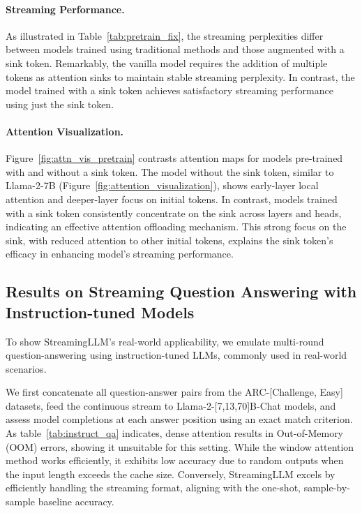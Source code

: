\paragraph{Streaming Performance.} As illustrated in Table~\ref{tab:pretrain_fix}, the streaming perplexities differ between models trained using traditional methods and those augmented with a sink token. Remarkably, the vanilla model requires the addition of multiple tokens as attention sinks to maintain stable streaming perplexity. In contrast, the model trained with a sink token achieves satisfactory streaming performance using just the sink token.

\paragraph{Attention Visualization.} 
Figure~\ref{fig:attn_vis_pretrain} contrasts attention maps for models pre-trained with and without a sink token. The model without the sink token, similar to Llama-2-7B (Figure~\ref{fig:attention_visualization}), shows early-layer local attention and deeper-layer focus on initial tokens. In contrast, models trained with a sink token consistently concentrate on the sink across layers and heads, indicating an effective attention offloading mechanism. This strong focus on the sink, with reduced attention to other initial tokens, explains the sink token's efficacy in enhancing model's streaming performance.

\subsection{Results on Streaming Question Answering with Instruction-tuned Models} To show StreamingLLM's real-world applicability, we emulate multi-round question-answering using instruction-tuned LLMs, commonly used in real-world scenarios.

We first concatenate all question-answer pairs from the ARC-[Challenge, Easy] datasets, feed the continuous stream to Llama-2-[7,13,70]B-Chat models, and assess model completions at each answer position using an exact match criterion. As table~\ref{tab:instruct_qa} indicates, dense attention results in Out-of-Memory (OOM) errors, showing it unsuitable for this setting. While the window attention method works efficiently, it exhibits low accuracy due to random outputs when the input length exceeds the cache size. Conversely, StreamingLLM excels by efficiently handling the streaming format, aligning with the one-shot, sample-by-sample baseline accuracy.

